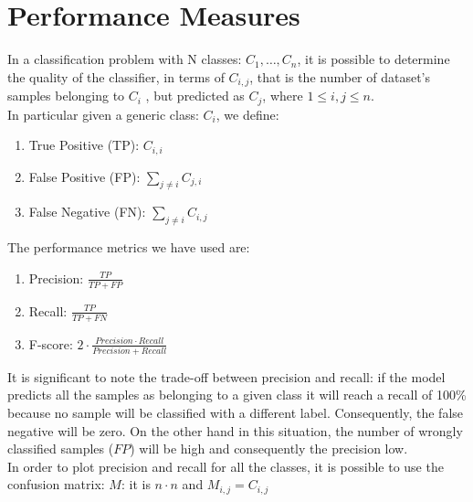 \documentclass[LaM,binding=0.6cm]{sapthesis}
\begin{document}
\section{Performance Measures}
In a classification problem with N classes: ${C_1,\dots,C_n}$, it is possible to determine the quality of the classifier, in terms of $C_{i,j}$, that is the number of dataset's samples belonging to $C_i$ , but predicted as $C_j$, where $1 \leq i,j \leq n$.\\In particular given a generic class: $C_i$, we define:
\begin{enumerate}
\item True Positive (TP): $C_{i,i}$%
\item False Positive (FP): $\sum_{j\neq i}C_{j,i}$
\item False Negative (FN): $\sum_{j\neq i}C_{i,j}$
\end{enumerate}
The performance metrics we have used are:
\begin{enumerate}
\item Precision: $\frac{TP}{TP+FP}$
\item Recall: $\frac{TP}{TP+FN}$
\item F-score: $2\cdot \frac{Precision\cdot Recall}{Precision+Recall}$
\end{enumerate}
It is significant to note the trade-off between precision and recall: if the model predicts all the samples as belonging to a given class it will reach a recall of 100\% because no sample will be classified with a different label. Consequently, the false negative will be zero. On the other hand in this situation, the number of wrongly classified samples ($FP$) will be high and consequently the precision low.\\In order to plot precision and recall for all the classes, it is possible to use the confusion matrix: $M$: it is $n\cdot n$ and $M_{i,j}=C_{i,j}$
\end{document}
